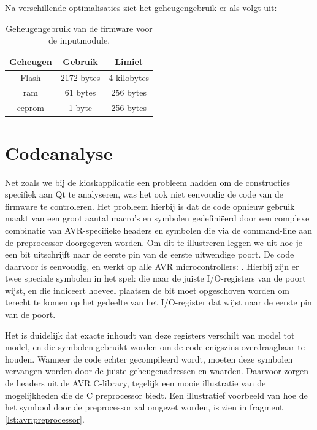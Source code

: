 Na verschillende optimalisaties ziet het geheugengebruik er als volgt uit:
\begin{table}[h!]
  \begin{center}
    \begin{tabular}{c c c}
    Geheugen & Gebruik & Limiet \\
    \hline
    Flash & 2172 bytes & 4 kilobytes \\
    \ac{ram} & 61 bytes & 256 bytes \\
    \ac{eeprom} & 1 byte & 256 bytes \\
    \end{tabular}
  \end{center}
  \caption{Geheugengebruik van de firmware voor de inputmodule.}
\end{table}

\section{Codeanalyse}
\label{inputmodule:firmware:codenalyse}

Net zoals we bij de kioskapplicatie een probleem hadden om de constructies specifiek aan Qt te analyseren, was het ook niet eenvoudig de code van de firmware te controleren. Het probleem hierbij is dat de code opnieuw gebruik maakt van een groot aantal macro's en symbolen gedefiniëerd door een complexe combinatie van AVR-specifieke headers en symbolen die via de command-line aan de preprocessor doorgegeven worden. Om dit te illustreren leggen we uit hoe je een bit uitschrijft naar de eerste pin van de eerste uitwendige poort. De code daarvoor is eenvoudig, en werkt op alle AVR microcontrollers: . Hierbij zijn er twee speciale symbolen in het spel:  die naar de juiste I/O-registers van de poort wijst, en  die indiceert hoeveel plaatsen de bit moet opgeschoven worden om terecht te komen op het gedeelte van het I/O-register dat wijst naar de eerste pin van de poort.

Het is duidelijk dat exacte inhoudt van deze registers verschilt van model tot model, en die symbolen gebruikt worden om de code enigszins overdraagbaar te houden. Wanneer de code echter gecompileerd wordt, moeten deze symbolen vervangen worden door de juiste geheugenadressen en waarden. Daarvoor zorgen de headers uit de AVR C-library, tegelijk een mooie illustratie van de mogelijkheden die de C preprocessor biedt. Een illustratief voorbeeld van hoe de het  symbool door de preprocessor zal omgezet worden, is zien in fragment \ref{lst:avr:preprocessor}.


